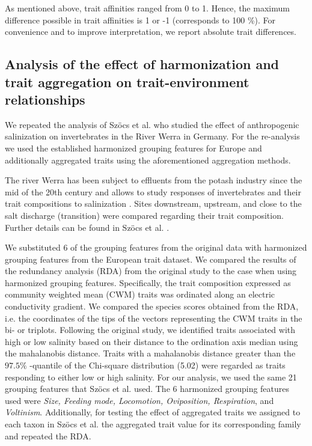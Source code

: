 \documentclass{article}
\begin{document}
As mentioned above, trait affinities ranged from 0 to 1. Hence, the maximum difference possible in trait affinities is 1 or -1 (corresponds to 100 \%). For convenience and to improve interpretation, we report absolute trait differences.


\subsection*{Analysis of the effect of harmonization and trait aggregation on trait-environment relationships}

We repeated the analysis of Szöcs et al. \cite{szocs_effects_2014} who studied the effect of anthropogenic salinization on invertebrates in the River Werra in Germany. For the re-analysis we used the established harmonized grouping features for Europe and additionally aggregated traits using the aforementioned aggregation methods. 

The river Werra has been subject to effluents from the potash industry since the mid of the 20th century and allows to study responses of invertebrates and their trait compositions to salinization \cite{bathe_biological_2011}. Sites downstream, upstream, and close to the salt discharge (transition) were compared regarding their trait composition. Further details can be found in Szöcs et al. \cite{szocs_effects_2014}. 

We substituted 6 of the grouping features from the original data with harmonized grouping features from the European trait dataset. We compared the results of the redundancy analysis (RDA) from the original study to the case when using harmonized grouping features. Specifically, the trait composition expressed as community weighted mean (CWM) traits was ordinated along an electric conductivity gradient. We compared the species scores obtained from the RDA, i.e. the coordinates of the tips of the vectors representing the CWM traits in the bi- or triplots. Following the original study, we identified traits associated with high or low salinity based on their distance to the ordination axis median using the mahalanobis distance. Traits with a mahalanobis distance greater than the $97.5 \%$ -quantile of the Chi-square distribution (5.02) were regarded as traits responding to either low or high salinity. For our analysis, we used the same 21 grouping features that Szöcs et al. \cite{szocs_effects_2014} used. The 6 harmonized grouping features used were \textit{Size, Feeding mode, Locomotion, Oviposition, Respiration}, and \textit{Voltinism}. Additionally, for testing the effect of aggregated traits we assigned to each taxon in Szöcs et al. \cite{szocs_effects_2014} the aggregated trait value for its corresponding family and repeated the RDA.  
\end{document}

